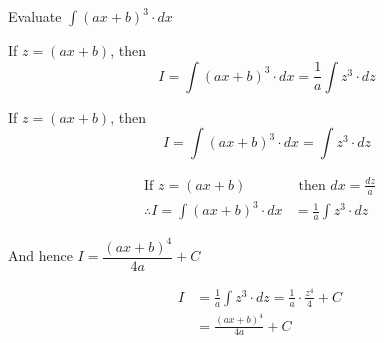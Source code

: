 \documentclass[14pt,fleqn]{extarticle}
\begin{document}
\newcommand\fx{ \left(ax+b \right)}

Evaluate $\int (ax+b)^3\cdot dx$

\newcard

If $z = \fx$, then 
\[ \quad I = \int \fx^3\cdot dx = \frac{1}{a}\int z^3\cdot dz \]

\newcard 

If $z = \fx$, then 
\[ \quad I = \int \fx^3\cdot dx = \int z^3\cdot dz \]

\newcard 

\begin{align}
	\text{If } z = \fx &\text{ then } dx = \frac{dz}{a} \\
	\therefore I = \int \fx^3\cdot dx &= \frac{1}{a}\int z^3\cdot dz
\end{align}

\newcard 

And hence $I = \dfrac{\fx^4}{4a} + C $ 

\newcard 

\begin{align}
	I &= \frac{1}{a}\int z^3\cdot dz = \frac{1}{a}\cdot \frac{z^4}{4} + C \\
	&= \frac{\fx^4}{4a} + C 
\end{align}
\end{document}
